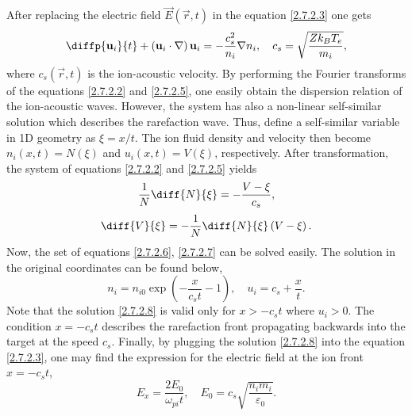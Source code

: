 After replacing the electric field $ \vec{E} \left(\vec{r}, t\right) $ in the equation \ref{2.7.2.3} one gets
\begin{equation}
\label{2.7.2.5}
\diffp{\vec{u}_i}{t} + \left(\vec{u}_i \cdot \grad{} \right) \vec{u}_i = - \frac{c_s^2}{n_i} \grad{n_i}, \quad c_s = \sqrt{\frac{Z k_B T_e}{m_i}},
\end{equation}
where $ c_s \left(\vec{r}, t\right) $ is the ion-acoustic velocity. By performing the Fourier transforms of the equations \ref{2.7.2.2} and \ref{2.7.2.5}, one easily obtain the dispersion relation of the ion-acoustic waves. However, the system has also a non-linear self-similar solution which describes the rarefaction wave. Thus, define a self-similar variable in 1D geometry as $ \xi = x/t $. The ion fluid density and velocity then become $ n_i \left(x, t\right) = N \left( \xi \right) $ and $ u_i \left(x, t\right) = V \left( \xi \right) $, respectively. After transformation, the system of equations \ref{2.7.2.2} and \ref{2.7.2.5} yields
\begin{equation}
\label{2.7.2.6}
\frac{1}{N} \diff{N}{\xi} = - \frac{V - \xi}{c_s},
\end{equation}
\begin{equation}
\label{2.7.2.7}
\diff{V}{\xi} = - \frac{1}{N} \diff{N}{\xi} \left(V - \xi \right).
\end{equation}
Now, the set of equations \ref{2.7.2.6}, \ref{2.7.2.7} can be solved easily. The solution in the original coordinates can be found below,
\begin{equation}
\label{2.7.2.8}
n_i = n_{i0} \exp \left( -\frac{x}{c_s t} - 1 \right), \quad u_i = c_s + \frac{x}{t}.
\end{equation}
Note that the solution \ref{2.7.2.8} is valid only for $ x > -c_s t $ where $ u_i > 0 $. The condition $ x = - c_s t $ describes the rarefaction front propagating backwards into the target at the speed $ c_s $. Finally, by plugging the solution \ref{2.7.2.8} into the equation \ref{2.7.2.3}, one may find the expression for the electric field at the ion front $ x = - c_s t $,
\begin{equation}
\label{2.7.2.9}
E_x = \frac{2 E_0}{\omega_{pi} t}, \quad E_0 = c_s \sqrt{\frac{n_i m_i}{\varepsilon_0}}.
\end{equation}

